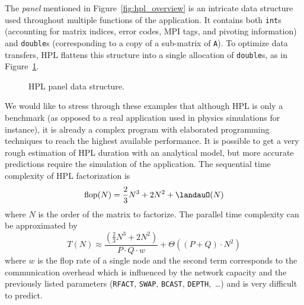         The \emph{panel} mentioned in Figure~\ref{fig:hpl_overview} is an intricate data structure used throughout
        multiple functions of the application.  It contains both \texttt{int}s (accounting for matrix indices, error
        codes, MPI tags, and pivoting information) and \texttt{double}s (corresponding to a copy of a sub-matrix of
        \texttt{A}). To optimize data transfers, HPL flattens this structure into a single allocation of
        \texttt{double}s, as in Figure~\ref{fig:hpl_panel_sourcecode}.
        \begin{figure}[htpb]
            \centering
            \lstset{frame=bt,language=C,numbers=none}
            \caption{HPL panel data structure.}%
            \label{fig:hpl_panel_sourcecode}
        \end{figure}

        We would like to stress through these examples that although HPL is only a benchmark (as opposed to a real
        application used in physics simulations for instance), it is already a complex program with elaborated
        programming techniques to reach the highest available performance.  It is possible to get a very rough
        estimation of HPL duration with an analytical model, but more accurate predictions require the simulation of the
        application. The sequential time complexity of HPL factorization is \[\mathrm{flop}(N) = \frac{2}{3}N^3 + 2N^2 +
        \landauO(N)\] where $N$ is the order of the matrix to factorize.  The parallel time complexity can be
        approximated by \[T(N) \approx \frac{\left(\frac{2}{3}N^3 + 2N^2\right)}{P\cdot{}Q\cdot{}w} +
        \Theta((P+Q)\cdot{}N^2)\] where $w$ is the flop rate of a single node and the second term corresponds to the
        communication overhead which is influenced by the network capacity and the previously listed parameters
        (\texttt{RFACT}, \texttt{SWAP}, \texttt{BCAST}, \texttt{DEPTH}, \ldots) and is very difficult to predict.

